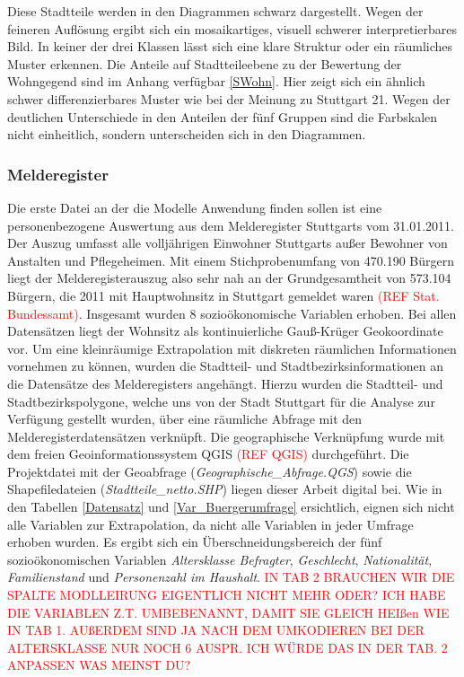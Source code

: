 \documentclass{Vorlage}
\begin{document}
Diese Stadtteile werden in den Diagrammen schwarz dargestellt. Wegen der feineren Auflösung ergibt sich ein 
mosaikartiges, visuell schwerer interpretierbares Bild. In keiner der drei Klassen lässt sich eine klare Struktur oder 
ein räumliches Muster erkennen. Die Anteile auf Stadtteileebene zu der Bewertung der Wohngegend sind im Anhang 
verfügbar \ref{SWohn}. Hier zeigt sich ein ähnlich schwer differenzierbares Muster wie bei der Meinung zu Stuttgart 21. 
Wegen der deutlichen Unterschiede in den Anteilen der fünf Gruppen sind die Farbskalen nicht einheitlich, sondern 
unterscheiden sich in den Diagrammen.\\

\subsubsection{Melderegister}
Die erste Datei an der die Modelle Anwendung finden sollen ist eine personenbezogene Auswertung aus dem Melderegister 
Stuttgarts vom 31.01.2011. Der Auszug umfasst alle volljährigen Einwohner Stuttgarts außer Bewohner von Anstalten und 
Pflegeheimen. Mit einem Stichprobenumfang von 470.190 Bürgern liegt der Melderegisterauszug also sehr nah an 
der Grundgesamtheit von 573.104 Bürgern, die 2011 mit Hauptwohnsitz in Stuttgart gemeldet waren \textcolor{red}{(REF 
Stat. Bundessamt)}. Insgesamt wurden 8 sozioökonomische Variablen erhoben. Bei allen Datensätzen liegt der Wohnsitz als 
kontinuierliche Gauß-Krüger Geokoordinate vor. Um eine kleinräumige Extrapolation mit diskreten räumlichen 
Informationen vornehmen zu können, wurden die Stadtteil- und Stadtbezirksinformationen an die Datensätze des 
Melderegisters angehängt. Hierzu wurden die Stadtteil- und Stadtbezirkspolygone, welche uns von der Stadt Stuttgart für 
die Analyse zur Verfügung gestellt wurden, über eine räumliche Abfrage mit den Melderegisterdatensätzen verknüpft. Die 
geographische Verknüpfung wurde mit dem freien Geoinformationssystem QGIS \textcolor{red}{(REF QGIS)} durchgeführt. Die 
Projektdatei mit der Geoabfrage (\textit{Geographische\_Abfrage.QGS}) sowie die Shapefiledateien 
(\textit{Stadtteile\_netto.SHP}) liegen dieser Arbeit digital bei. Wie in den Tabellen \ref{Datensatz} und 
\ref{Var_Buergerumfrage} ersichtlich, eignen sich nicht alle Variablen zur Extrapolation, da nicht alle Variablen in 
jeder Umfrage erhoben wurden. Es ergibt sich ein Überschneidungsbereich der fünf sozioökonomischen Variablen 
\textit{Altersklasse Befragter}, \textit{Geschlecht}, \textit{Nationalität}, \textit{Familienstand} und 
\textit{Personenzahl im Haushalt}. \textcolor{red}{IN TAB 2 BRAUCHEN WIR DIE SPALTE MODLLEIRUNG EIGENTLICH NICHT MEHR 
ODER? ICH HABE DIE VARIABLEN Z.T. UMBEBENANNT, DAMIT SIE GLEICH HEIßen WIE IN TAB 1. AUßERDEM SIND JA NACH DEM 
UMKODIEREN BEI DER ALTERSKLASSE NUR NOCH  6 AUSPR. ICH WÜRDE DAS IN DER TAB. 2 ANPASSEN WAS MEINST DU?}
\end{document}

